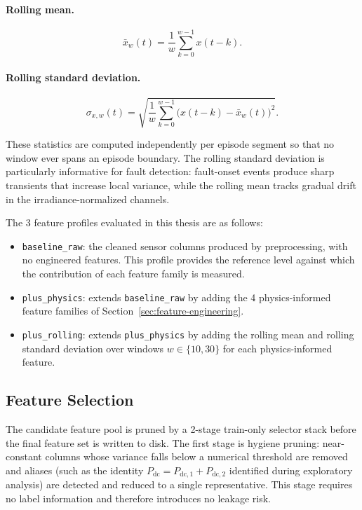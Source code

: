 \paragraph{Rolling mean.}
\[
    \bar{x}_{w}(t) = \frac{1}{w} \sum_{k=0}^{w-1} x(t - k).
\]

\paragraph{Rolling standard deviation.}
\[
    \sigma_{x,w}(t) = \sqrt{\frac{1}{w} \sum_{k=0}^{w-1} \bigl(x(t-k) - \bar{x}_{w}(t)\bigr)^{2}}.
\]

These statistics are computed independently per episode segment so that no window ever spans an episode boundary. The rolling standard deviation is particularly informative for fault detection: fault-onset events produce sharp transients that increase local variance, while the rolling mean tracks gradual drift in the irradiance-normalized channels.

The 3 feature profiles evaluated in this thesis are as follows:

\begin{itemize}
    \item \texttt{baseline\_raw}: the cleaned sensor columns produced by preprocessing, with no engineered features. This profile provides the reference level against which the contribution of each feature family is measured.
    \item \texttt{plus\_physics}: extends \texttt{baseline\_raw} by adding the 4 physics-informed feature families of Section~\ref{sec:feature-engineering}.
    \item \texttt{plus\_rolling}: extends \texttt{plus\_physics} by adding the rolling mean and rolling standard deviation over windows $w \in \{10, 30\}$ for each physics-informed feature.
\end{itemize}

\subsection{Feature Selection}

The candidate feature pool is pruned by a 2-stage train-only selector stack before the final feature set is written to disk. The first stage is hygiene pruning: near-constant columns whose variance falls below a numerical threshold are removed and aliases (such as the identity $P_{\mathrm{dc}} = P_{\mathrm{dc},1} + P_{\mathrm{dc},2}$ identified during exploratory analysis) are detected and reduced to a single representative. This stage requires no label information and therefore introduces no leakage risk.

